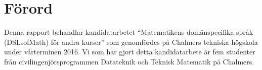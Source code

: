 \documentclass[12pt,a4paper,twoside,openright]{article}
\date{\today}
\begin{document}




\setlength{\parskip}{2mm}
\setlength{\parindent}{0pt}

%
%
%
%
%
%
%
%
%
%


\section*{Förord}
Denna rapport behandlar kandidatarbetet ``Matematikens domänspecifika
språk (DSLsofMath) för andra kurser'' som genomfördes på Chalmers
tekniska högskola under vårterminen 2016. Vi som har gjort detta
kandidatarbete är fem studenter från civilingenjörsprogrammen
Datateknik och Teknisk Matematik på Chalmers.
\end{document}
